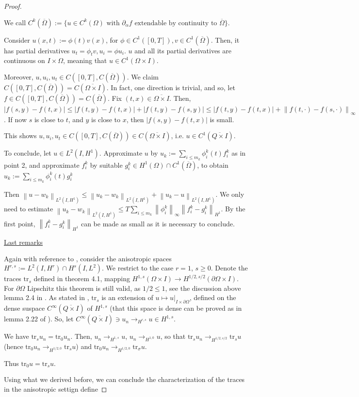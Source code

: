 \documentclass[english,a4paper,10pt,oneside]{scrbook}	%
\theoremstyle{break}
\newenvironment{mproof}[1][\proofname]{%
  \begin{proof}[#1]$ $\par\nobreak\ignorespaces
}{%
  \end{proof}
}
\renewcommand*{\proofname}{Proof}
\theoremstyle{remark}
\newcommand{\ds}{\displaystyle}
\newcommand{\norm}[1]{\left\lVert#1\right\rVert}
\newcommand{\tr}{\text{tr}}
\begin{document}
\begin{mproof}
We call $C^k(\overline{\Omega}):=\{u \in C^k(\Omega) \text{ with }\partial_\alpha f \text{ extendable by continuity to } \overline{\Omega} \}$. 

Consider $u(x,t):=\phi(t)v(x)$, for $\phi \in C^1([0,T]), v \in C^1(\overline{\Omega})$. Then, it has partial derivatives $u_t = \phi_t v, u_i = \phi u_i$. $u$ and all its partial derivatives are continuous on $I\times \Omega$, meaning that $u \in C^1(\Omega \times I)$.

Moreover, $u, u_i, u_t \in C([0,T], C(\overline{\Omega}))$. We claim $ C([0,T], C(\overline{\Omega})) = C(\overline{\Omega\times I})$. In fact, one direction is trivial, and so, let $f \in C([0,T], C(\overline{\Omega})) = C(\overline{\Omega})$. Fix $(t,x) \in \overline{\Omega\times I}$. Then, $|f(s,y)-f(t,x)|\leq |f(t,y)-f(t,x)|+|f(t,y)-f(s,y)|\leq  |f(t,y)-f(t,x)|+\norm{f(t, \cdot)-f(s,\cdot)}_{\infty}$. If now $s$ is close to $t$, and $y$ is close to $x$, then $|f(s,y)-f(t,x)|$ is small.

This shows $u, u_i, u_t \in C([0,T], C(\overline{\Omega})) \in C(\overline{\Omega\times I}) $, i.e. $u \in C^1(\overline{Q\times I})$.

To conclude, let $u \in L^2(I,H^1)$. Approximate $u$ by $u_k:=\sum_{i\leq m_k} \phi_i^k(t)f_i^k$ as in point 2, and approximate $f_i^k$ by suitable $g_i^k \in H^1(\Omega)\cap C^1(\overline{\Omega})$, to obtain $u_k:=\sum_{i\leq m_k} \phi_i^k(t)g_i^k$

Then $\norm{u-w_k}_{L^2(I,H^1)}\leq \norm{u_k-w_k}_{L^2(I,H^1)}+\norm{u_k-u}_{L^2(I,H^1)}$. We only need to estimate $ \norm{u_k-w_k}_{L^2(I,H^1)}\leq\ds  T \sum_{i\leq m_k} \norm{\phi_i^k}_\infty\norm{f_i^k-g_i^k}_{H^1}$. By the first point, $\norm{f_i^k-g_i^k}_{H^1}$ can be made as small as it is necessary to conclude.

\underline{Last remarks}

Again with reference to \cite{lions}, consider the anisotropic spaces $H^{r,s}:=L^2(I,H^r)\cap H^s(I,L^2)$. We restrict to the case $r = 1$, $s\geq 0$. Denote the traces $\tr_s$ defined in theorem 4.1, mapping $H^{1,s}(\Omega \times I)\rightarrow H^{1/2, s/2}(\partial \Omega \times I)$. For $\partial \Omega$ Lipschitz this theorem is still valid, as $1/2\leq 1$, see the discussion above lemma 2.4 in \cite{costabel}. As stated in \cite{lions}, $\tr_s$ is an extension of  $u\mapsto u|_{I\times \partial \Omega}$, defined on the dense suspace $C^\infty(\overline{Q\times I})$ of $H^{1,s}$ (that this space is dense can be proved as in lemma 2.22 of \cite{costabel}). So, let $C^\infty(\overline{Q\times I})\ni u_n \rightarrow_{H^{r,s}} u \in H^{1,s}$.
 
We have $\tr_s u_n = \tr_0 u_n$. Then, $u_n \rightarrow_{H^{1,s}} u$, $u_n \rightarrow_{H^{1,0}} u$, so that $\tr_s u_n \rightarrow_{H^{1/2,s/2}}\tr_s u$ (hence $\tr_0 u_n \rightarrow_{H^{1/2,0}}\tr_s u$) and $\tr_0 u_n  \rightarrow_{H^{1/2,0}} \tr_\sigma u$.

Thus $\tr_0 u = \tr_s u$.

Using what we derived before, we can conclude the characterization of the traces in the anisotropic settign define 

\end{mproof}
\end{document}
